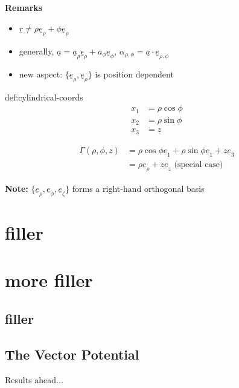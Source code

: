 \documentclass{article}
\begin{document}
\textbf{Remarks}

\begin{itemize}
    \item $\underline{r} \ne \rho \underline{e}_{\rho} + \phi\underline{e}_{\rho}$
    \item generally, $\underline{a} = \underline{a}_{\rho}\underline{\epsilon}_{\rho} + a_{\phi}\underline{e}_{\phi},\, \alpha_{\rho, \phi} = \underline{a} \cdot \underline{e}_{\rho, \phi}$
    \item new aspect: $\{ \underline{e}_{\rho}, \underline{e}_{\rho}\}$ is position dependent
\end{itemize}


\begin{dfn}{def:cylindrical-coords}{}
    \begin{align*}
        x_{1} &= \rho\cos\phi\\
        x_{2} &= \rho\sin\phi\\
        x_{3} &= z
    \end{align*}

    \begin{align*}
        \underline{\Gamma}(\rho,\phi,z) &= \rho\cos\phi \underline{e}_{1} + \rho\sin\phi\underline{e}_{1} + z\underline{e}_{3}\\
                                        &= \rho\underline{e}_{\rho} + z\underline{e}_{z} \text{ (special case)}
    \end{align*}

    \textbf{Note:} $\{\underline{e}_{\rho}, \underline{e}_{\phi}, \underline{e}_{\zeta}\}$ forms a right-hand orthogonal basis
\end{dfn}

\newpage
\section{filler}
\section{more filler}
\subsection{filler}
\subsection{The Vector Potential}

Results ahead...
\end{document}
